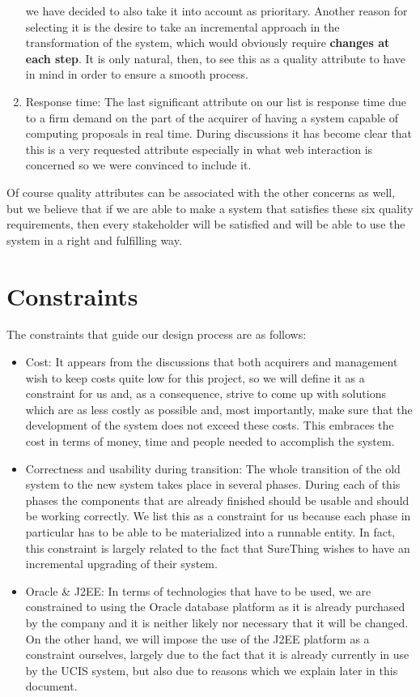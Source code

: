\begin{enumerate}
we have decided to also take it into account as prioritary. Another
reason for selecting it is the desire to take an incremental approach
in the transformation of the system, which would obviously require
\textbf{changes at each step}. It is only natural, then, to see this as a quality
attribute to have in mind in order to ensure a smooth process.
\item Response time: The last significant attribute on our list is response
time due to a firm demand on the part of the acquirer of having a
system capable of computing proposals in real time. During discussions
it has become clear that this is a very requested attribute especially in
what web interaction is concerned so we were convinced to include it.
\end{enumerate}

Of course quality attributes can be associated with the other concerns
as well, but we believe that if we are able to make a system that satisfies
these six quality requirements, then every stakeholder will be satisfied and
will be able to use the system in a right and fulfilling way.

\section{Constraints}
The constraints that guide our design process are as follows:
\begin{itemize}
\item Cost: It appears from the discussions that both acquirers and management
wish to keep costs quite low for this project, so we will define it as a constraint
for us and, as a consequence, strive to come up with solutions which are
as less costly as possible and, most importantly, make sure that the development
of the system does not exceed these costs. This embraces the cost in terms of
money, time and people needed to accomplish the system.
\item Correctness and usability during transition: The whole transition of the
old system to the new system takes place in several phases. During each of
this phases the components that are already finished should be usable and
should be working correctly. We list this as a constraint for us because each
phase in particular has to be able to be materialized into a runnable entity.
In fact, this constraint is largely related to the fact that SureThing wishes to have
an incremental upgrading of their system.
\item Oracle \& J2EE: In terms of technologies that have to be used, we are constrained
to using the Oracle database platform as it is already purchased by the company
and it is neither likely nor necessary that it will be changed. On the other hand,
we will impose the use of the J2EE platform as  a constraint ourselves, largely
due to the fact that it is already currently in use by the UCIS system, but also due
to reasons which we explain later in this document.
\end{itemize}
